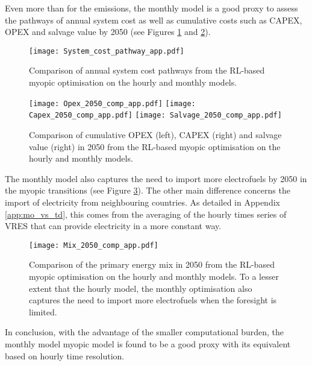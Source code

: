 

Even more than for the emissions, the monthly model is a good proxy to assess the pathways of annual system cost as well as cumulative costs such as CAPEX, OPEX and salvage value by 2050 (see Figures \ref{fig:app:System_cost_pathway} and \ref{fig:app:Opex_Capex_Salvage_comp}).

\begin{figure}[!htbp]
\centering
\texttt{[image: System\_cost\_pathway\_app.pdf]}
\caption{Comparison of annual system cost pathways from the \gls{RL}-based myopic optimisation on the hourly and monthly models.}
\label{fig:app:System_cost_pathway}
\end{figure}

\begin{figure}[!htbp]
\centering
\texttt{[image: Opex\_2050\_comp\_app.pdf]}
\texttt{[image: Capex\_2050\_comp\_app.pdf]}
\texttt{[image: Salvage\_2050\_comp\_app.pdf]}
\caption{Comparison of cumulative OPEX (left), CAPEX (right) and salvage value (right) in 2050 from the \gls{RL}-based myopic optimisation on the hourly and monthly models.}
\label{fig:app:Opex_Capex_Salvage_comp}
\end{figure}

\newpage
The monthly model also captures the need to import more electrofuels by 2050 in the myopic transitions (see Figure \ref{fig:app:Mix_2050_comp}). The other main difference concerns the import of electricity from neighbouring countries. As detailed in Appendix \ref{app:mo_vs_td}, this comes from the averaging of the hourly times series of \gls{VRES} that can provide electricity in a more constant way.

\begin{figure}[!htbp]
\centering
\texttt{[image: Mix\_2050\_comp\_app.pdf]}
\caption{Comparison of the primary energy mix in 2050 from the \gls{RL}-based myopic optimisation on the hourly and monthly models. To a lesser extent that the hourly model, the monthly optimisation also captures the need to import more electrofuels when the foresight is limited.}
\label{fig:app:Mix_2050_comp}
\end{figure}

In conclusion, with the advantage of the smaller computational burden, the monthly model myopic model is found to be a good proxy with its equivalent based on hourly time resolution.